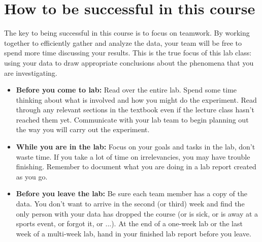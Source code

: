 \section*{How to be successful in this course}
The key to being successful in this course is to focus on teamwork.
By working together to efficiently gather and analyze the data, your team will be free to spend more time discussing your results.
This is the true focus of this lab class: using your data to draw appropriate conclusions about the phenomena that you are investigating.
\begin{itemize}
	\setlength\itemsep{2pt}
	\item \textbf{Before you come to lab:} Read over the entire lab.
	Spend some time thinking about what is involved and how you might do the experiment.
	Read through any relevant sections in the textbook even if the lecture class hasn't reached them yet.
	Communicate with your lab team to begin planning out the way you will carry out the experiment.
	\item \textbf{While you are in the lab:} Focus on your goals and tasks in the lab, don't waste time.
	If you take a lot of time on irrelevancies, you may have trouble finishing.
	Remember to document what you are doing in a lab report created as you go.
	\item \textbf{Before you leave the lab:} Be sure each team member has a copy of the data.
	You don't want to arrive in the second (or third) week and find the only person with your data has dropped the course (or is sick, or is away at a sports event, or forgot it, or ...).
	At the end of a one-week lab or the last week of a multi-week lab, hand in your finished lab report before you leave.
\end{itemize}

